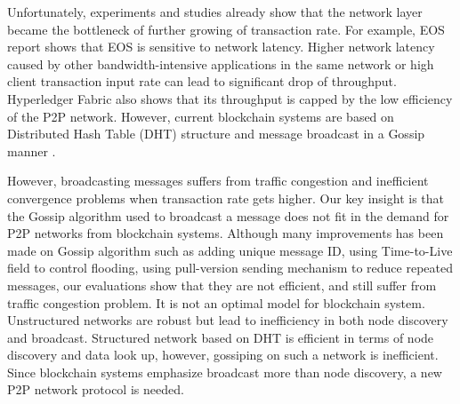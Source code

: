 Unfortunately, experiments and studies \cite{cachin2016architecture, xueos, li2018scaling} already show that the network layer became the bottleneck of further growing of transaction rate. For example, EOS report \cite{xueos} shows that EOS is sensitive to network latency. Higher network latency caused by other bandwidth-intensive applications in the same network or high client transaction input rate can lead to significant drop of throughput. Hyperledger Fabric \cite{cachin2016architecture} also shows that its throughput is capped by the low efficiency of the P2P network. However, current blockchain systems are based on Distributed Hash Table (DHT) structure and message broadcast in a Gossip manner \cite{eugster2004epidemic}. 

However, broadcasting messages suffers from traffic congestion and inefficient convergence problems when transaction rate gets higher. Our key insight is that the Gossip algorithm used to broadcast a message does not fit in the demand for P2P networks from blockchain systems. Although many improvements has been made on Gossip algorithm such as adding unique message ID, using Time-to-Live field to control flooding, using pull-version sending mechanism to reduce repeated messages, our evaluations show that they are not efficient, and still suffer from traffic congestion problem. It is not an optimal model for blockchain system. Unstructured networks are robust but lead to inefficiency in both node discovery and broadcast. Structured network based on DHT is efficient in terms of node discovery and data look up, however, gossiping on such a network is inefficient. Since blockchain systems emphasize broadcast more than node discovery, a new P2P network protocol is needed.

